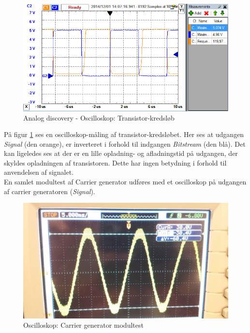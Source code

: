 \begin{figure}[h]
	\centering
	\includegraphics[width={\textwidth - 0.5 cm}, trim=0 0 0 0, clip=true]{../Implementering/billeder/TransistorImpl.png}
	\caption{Analog discovery - Oscilloskop: Transistor-kredsløb}
	\label{fig:TransistorImpl}
\end{figure}

På figur \ref{fig:TransistorImpl} ses en oscilloskop-måling af transistor-kredsløbet. Her ses at udgangen \textit{Signal} (den orange), er inverteret i forhold til indgangen \textit{Bitstream} (den blå). Det kan ligeledes ses at der er en lille opladning- og afladningstid på udgangen, der skyldes opladningen af transistoren. Dette har ingen betydning i forhold til anvendelsen af signalet.\\

\newpage
En samlet modultest af Carrier generator udføres med et oscilloskop på udgangen af carrier generatoren (\textit{Signal}).\\

\begin{figure}[h]
	\centering
	\includegraphics[width={\textwidth - 1 cm}, trim=0 0 0 0, clip=true]{../Implementering/billeder/CGImpl1.jpg}
	\caption{Oscilloskop: Carrier generator modultest }
	\label{fig:CGImpl1}
\end{figure}

